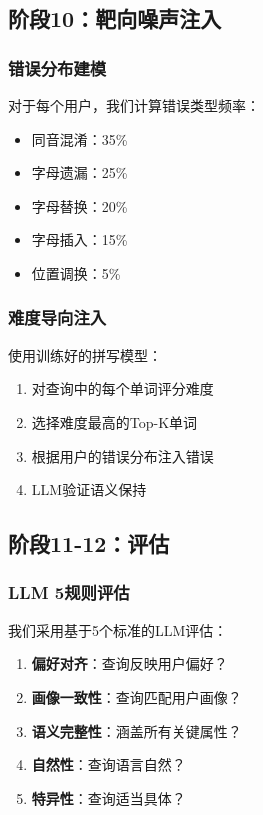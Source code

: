 \documentclass[11pt,a4paper]{article}
\begin{document}
\subsection{阶段10：靶向噪声注入}

\subsubsection{错误分布建模}

对于每个用户，我们计算错误类型频率：
\begin{itemize}
    \item 同音混淆：35\%
    \item 字母遗漏：25\%
    \item 字母替换：20\%
    \item 字母插入：15\%
    \item 位置调换：5\%
\end{itemize}

\subsubsection{难度导向注入}

使用训练好的拼写模型：
\begin{enumerate}
    \item 对查询中的每个单词评分难度
    \item 选择难度最高的Top-K单词
    \item 根据用户的错误分布注入错误
    \item LLM验证语义保持
\end{enumerate}

\subsection{阶段11-12：评估}

\subsubsection{LLM 5规则评估}

我们采用基于5个标准的LLM评估：
\begin{enumerate}
    \item \textbf{偏好对齐}：查询反映用户偏好？
    \item \textbf{画像一致性}：查询匹配用户画像？
    \item \textbf{语义完整性}：涵盖所有关键属性？
    \item \textbf{自然性}：查询语言自然？
    \item \textbf{特异性}：查询适当具体？
\end{enumerate}
\end{document}
